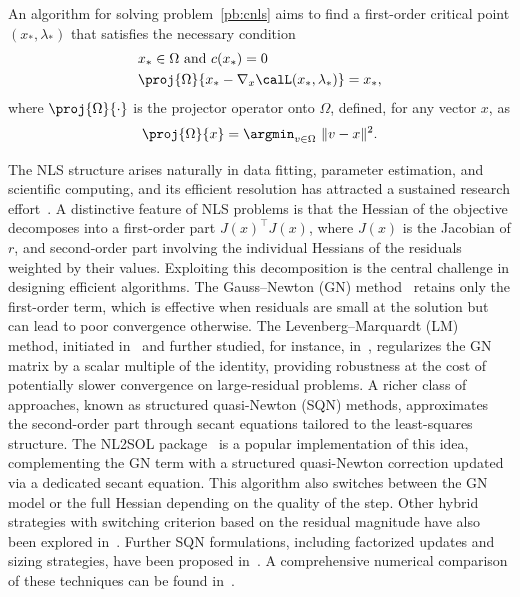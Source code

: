 An algorithm for solving problem~\eqref{pb:cnls} aims to find a first-order critical point $(x_*,\lambda_*)$ that satisfies the necessary condition
\begin{equation*}
	\begin{aligned}
		&x_* \in \Omega\ \text{and}\ c(x_*)=0 \\
		&\proj{\Omega}{x_*-\nabla_x \calL(x_*,\lambda_*)}=x_*,
	\end{aligned}
\end{equation*}
where $\proj{\Omega}{\cdot}$ is the projector operator onto $\Omega$, defined, for any vector $x$, as
\begin{equation*}
	\proj{\Omega}{x}= \argmin_{v\in \Omega} \ \|v-x\|^2. 
\end{equation*}

The NLS structure arises naturally in data fitting, parameter estimation, and scientific computing, and its efficient resolution has attracted a sustained research effort~\cite{dennisschnabel:1996,nocedalwright:2006,bjork:2024}. 
A distinctive feature of NLS problems is that the Hessian of the objective decomposes into a first-order part $J(x)^\top J(x)$, where $J(x)$ is the Jacobian of $r$, and second-order part involving the individual Hessians of the residuals weighted by their values. Exploiting this decomposition is the central challenge in designing
efficient algorithms.
The Gauss--Newton (GN) method~\cite[][Chapter 9]{dennisschnabel:1996} retains only the first-order term, which is effective when residuals are small at the solution but can lead to poor convergence otherwise.
The Levenberg--Marquardt (LM) method, initiated in~\cite{levenberg:1944,	marquardt:1963} and further studied, for instance, in~\cite{bellavia-etal:2018,	bergou-etal:2021}, regularizes the GN matrix by a scalar multiple of the identity, providing robustness at the cost of potentially slower convergence on large-residual problems.
A richer class of approaches, known as structured quasi-Newton (SQN) methods, approximates the second-order part through secant equations tailored to the least-squares structure. The NL2SOL package~\cite{dennisetal:1981,dennis-etal:1989} is a popular implementation of this idea, complementing the GN term with a structured quasi-Newton correction updated via a dedicated secant equation. This algorithm also switches between the GN model or the full Hessian depending on the quality of the step. Other hybrid strategies with switching criterion based on the residual magnitude have also been explored in~\cite{albaalifletcher:1985, fletcherxu:1987, zhouchen:2010}. Further SQN formulations, including factorized updates and sizing strategies, have been proposed in~\cite{biggs:1977, betts:1976, huschens1994, yabetakahashi:1991, zhang-etal:2000}. A comprehensive numerical comparison of these techniques can be found in~\cite{lucksan-etal:2019}.


